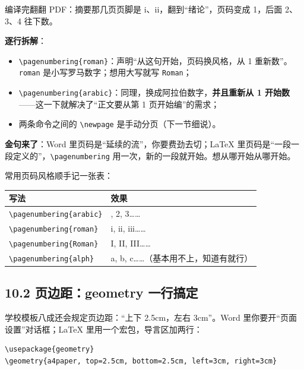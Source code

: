 编译完翻翻 PDF：摘要那几页页脚是 i、ii，翻到“绪论”，页码变成 1，后面 2、3、4 往下数。

\textbf{逐行拆解}：

\begin{itemize}
\setlength{\itemsep}{2pt}
\item \texttt{\textbackslash{}pagenumbering\{roman\}}：声明“从这句开始，页码换风格，从 1 重新数”。\texttt{roman} 是小写罗马数字；想用大写就写 \texttt{Roman}；
\item \texttt{\textbackslash{}pagenumbering\{arabic\}}：同理，换成阿拉伯数字，\textbf{并且重新从 1 开始数}——这一下就解决了“正文要从第 1 页开始编”的需求；
\item 两条命令之间的 \texttt{\textbackslash{}newpage} 是手动分页（下一节细说）。
\end{itemize}

\textbf{金句来了}：Word 里页码是“延续的流”，你要费劲去切；LaTeX 里页码是“一段一段定义的”，\texttt{\textbackslash{}pagenumbering} 用一次，新的一段就开始。想从哪开始从哪开始。

常用页码风格顺手记一张表：

\begin{table}[htbp]
\centering
\small
\begin{tabularx}{\linewidth}{@{}*{2}{>{\raggedright\arraybackslash}X}@{}}
\toprule
\textbf{写法} & \textbf{效果} \\
\midrule
\texttt{\textbackslash{}pagenumbering\{arabic\}} & 1, 2, 3…… \\
\texttt{\textbackslash{}pagenumbering\{roman\}} & i, ii, iii…… \\
\texttt{\textbackslash{}pagenumbering\{Roman\}} & I, II, III…… \\
\texttt{\textbackslash{}pagenumbering\{alph\}} & a, b, c……（基本用不上，知道有就行） \\
\bottomrule
\end{tabularx}
\end{table}

\subsection*{10.2 页边距：geometry 一行搞定}

学校模板八成还会规定页边距：“上下 2.5cm，左右 3cm”。Word 里你要开“页面设置”对话框；LaTeX 里用一个宏包，导言区加两行：

\begin{lstlisting}
\usepackage{geometry}
\geometry{a4paper, top=2.5cm, bottom=2.5cm, left=3cm, right=3cm}
\end{lstlisting}

